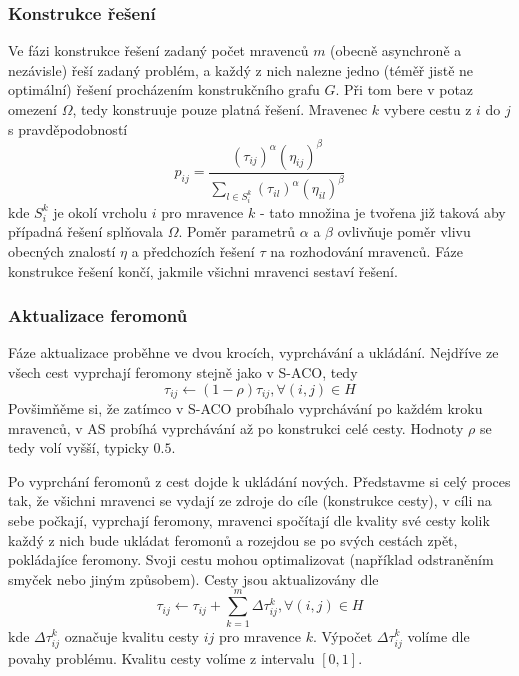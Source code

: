 \documentclass[12pt]{article}
\begin{document}
\subsubsection{Konstrukce řešení}
Ve fázi konstrukce řešení zadaný počet mravenců $m$ (obecně asynchroně a nezávisle) řeší zadaný problém, a každý z nich nalezne jedno (téměř jistě ne optimální) řešení procházením konstrukčního grafu $G$. Při tom bere v potaz omezení $\Omega$, tedy konstruuje pouze platná řešení. Mravenec $k$ vybere cestu z $i$ do $j$ s pravděpodobností
\begin{equation}\label{acopravdepodnost}
p_{ij} = \frac{(\tau_{ij})^\alpha(\eta_{ij})^\beta}{\sum_{l \in S_{i}^{k}}(\tau_{il})^\alpha (\eta_{il})^\beta}
\end{equation}
kde $S_i^k$ je okolí vrcholu $i$ pro mravence $k$ - tato množina je tvořena již taková aby případná řešení spl\v{n}ovala $\Omega$. Poměr parametrů $\alpha$ a $\beta$ ovliv\v{n}uje poměr vlivu obecných znalostí $\eta$ a předchozích řešení $\tau$ na rozhodování mravenců. Fáze konstrukce řešení končí, jakmile všichni mravenci sestaví řešení.

\subsubsection{Aktualizace feromonů}
Fáze aktualizace proběhne ve dvou krocích, vyprchávání a ukládání. Nejdříve ze všech cest vyprchají feromony stejně jako v \ac{S-ACO}, tedy
\begin{equation}\label{eq:aco-aktualizace}
\tau_{ij} \leftarrow (1 - \rho)\tau_{ij}, \forall(i,j) \in H
\end{equation}
Povšim\v{n}ěme si, že zatímco v S-ACO probíhalo vyprchávání po každém kroku mravenců, v AS probíhá vyprchávání až po konstrukci celé cesty. Hodnoty $\rho$ se tedy volí vyšší, typicky $0.5$.

Po vyprchání feromonů z cest dojde k ukládání nových. Představme si celý proces tak, že všichni mravenci se vydají ze zdroje do cíle (konstrukce cesty), v cíli na sebe počkají, vyprchají feromony, mravenci spočítají dle kvality své cesty kolik každý z nich bude ukládat feromonů a rozejdou se po svých cestách zpět, pokládajíce feromony. Svoji cestu mohou optimalizovat (například odstraněním smyček nebo jiným způsobem). Cesty jsou aktualizovány dle
\begin{equation}\label{acovyprchavani}
\tau_{ij} \leftarrow \tau_{ij} + \sum_{k=1}^m \Delta \tau_{ij}^k,    \forall(i,j) \in H
\end{equation}
kde $\Delta \tau_{ij}^k$ označuje kvalitu cesty $ij$ pro mravence $k$. Výpočet $\Delta \tau_{ij}^k$ volíme dle povahy problému. Kvalitu cesty volíme z intervalu $\left[ 0, 1 \right]$. \cite{maniezzo2004}
\end{document}
